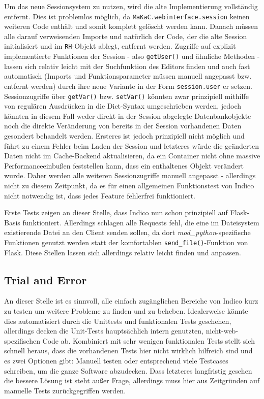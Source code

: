 Um das neue Sessionsystem zu nutzen, wird die alte Implementierung vollständig entfernt. Dies ist
problemlos möglich, da \lstinline{MaKaC.webinterface.session} keinen weiteren Code enthält und somit
komplett gelöscht werden kann. Danach müssen alle darauf verweisenden Importe und natürlich der
Code, der die alte Session initialisiert und im \lstinline{RH}-Objekt ablegt, entfernt werden.
Zugriffe auf explizit implementierte Funktionen der Session - also \lstinline{getUser()} und
ähnliche Methoden - lassen sich relativ leicht mit der Suchfunktion des Editors finden und auch fast
automatisch (Imports und Funktionsparameter müssen manuell angepasst bzw. entfernt werden) durch
ihre neue Variante in der Form \lstinline{session.user} er setzen. Sessionzugriffe über
\lstinline{getVar()} bzw. \lstinline{setVar()} könnten zwar prinzipiell mithilfe von regulären
Ausdrücken in die Dict-Syntax umgeschrieben werden, jedoch könnten in diesem Fall weder direkt in
der Session abgelegte Datenbankobjekte noch die direkte Veränderung von bereits in der Session
vorhandenen Daten gesondert behandelt werden. Ersteres ist jedoch prinzipiell nicht möglich und
führt zu einem Fehler beim Laden der Session und letzteres würde die geänderten Daten nicht im
Cache-Backend aktualisieren, da ein Container nicht ohne massive Performanceeinbußen feststellen
kann, dass ein enthaltenes Objekt verändert wurde. Daher werden alle weiteren Sessionzugriffe
manuell angepasst - allerdings nicht zu diesem Zeitpunkt, da es für einen allgemeinen Funktionstest
von Indico nicht notwendig ist, dass jedes Feature fehlerfrei funktioniert.

Erste Tests zeigen an dieser Stelle, dass Indico nun schon prinzipiell auf Flask-Basis funktioniert.
Allerdings schlagen alle Requests fehl, die eine im Dateisystem existierende Datei an den Client
senden sollen, da dort \emph{mod\_python}-spezifische Funktionen genutzt werden statt der
komfortablen \lstinline{send_file()}-Funktion von Flask. Diese Stellen lassen sich allerdings
relativ leicht finden und anpassen.



\subsection{Trial and Error}
An dieser Stelle ist es sinnvoll, alle einfach zugänglichen Bereiche von Indico kurz zu testen um
weitere Probleme zu finden und zu beheben. Idealerweise könnte dies automatisiert durch die
Unittests und funktionalen Tests geschehen, allerdings decken die Unit-Tests hauptsächlich intern
genutzten, nicht-web-spezifischen Code ab. Kombiniert mit sehr wenigen funktionalen Tests stellt
sich schnell heraus, dass die vorhandenen Tests hier nicht wirklich hilfreich sind und es zwei
Optionen gibt: Manuell testen oder entsprechend viele Testcases schreiben, um die ganze Software
abzudecken. Dass letzteres langfristig gesehen die bessere Lösung ist steht außer Frage, allerdings
muss hier aus Zeitgründen auf manuelle Tests zurückgegriffen werden.

